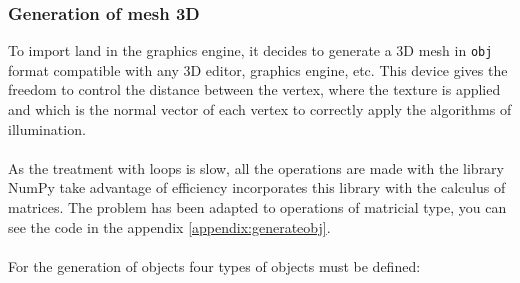 \documentclass[10pt,a4paper,twocolumn,twoside]{article}
\begin{document}
\subsubsection{Generation of mesh 3D}
\label{mesh3d}
To import land in the graphics engine, it decides to generate a 3D mesh in {\tt obj} format compatible with any 3D editor, graphics engine, etc. This device gives the freedom to control the distance between the vertex, where the texture is applied and which is the normal vector of each vertex to correctly apply the algorithms of illumination.
\\
\\
As the treatment with loops is slow, all the operations are made with the library NumPy take advantage of efficiency incorporates this library with the calculus of matrices. The problem has been adapted to operations of matricial type, you can see the code in the appendix \ref{appendix:generateobj}.
\\
\\
For the generation of objects four types of objects must be defined:
\end{document}
